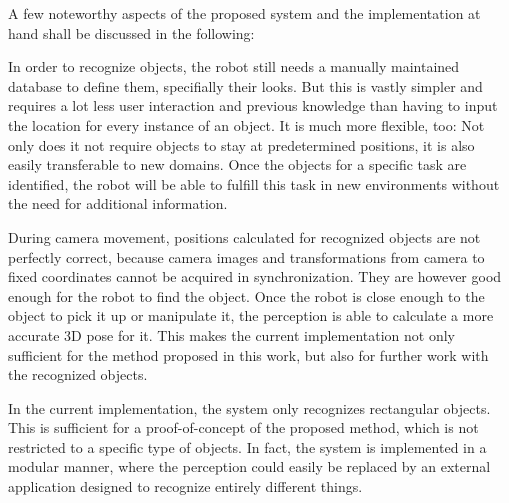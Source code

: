 A few noteworthy aspects of the proposed system and the implementation at hand shall be discussed in the following:

In order to recognize objects, the robot still needs a manually maintained database to define them, specifially their looks. But this is vastly simpler and requires a lot less user interaction and previous knowledge than having to input the location for every instance of an object. It is much more flexible, too: Not only does it not require objects to stay at predetermined positions, it is also easily transferable to new domains. Once the objects for a specific task are identified, the robot will be able to fulfill this task in new environments without the need for additional information.

During camera movement, positions calculated for recognized objects are not perfectly correct, because camera images and transformations from camera to fixed coordinates cannot be acquired in synchronization. They are however good enough for the robot to find the object. Once the robot is close enough to the object to pick it up or manipulate it, the perception is able to calculate a more accurate 3D pose for it. This makes the current implementation not only sufficient for the method proposed in this work, but also for further work with the recognized objects.

In the current implementation, the system only recognizes rectangular objects. This is sufficient for a proof-of-concept of the proposed method, which is not restricted to a specific type of objects. In fact, the system is implemented in a modular manner, where the perception could easily be replaced by an external application designed to recognize entirely different things.
